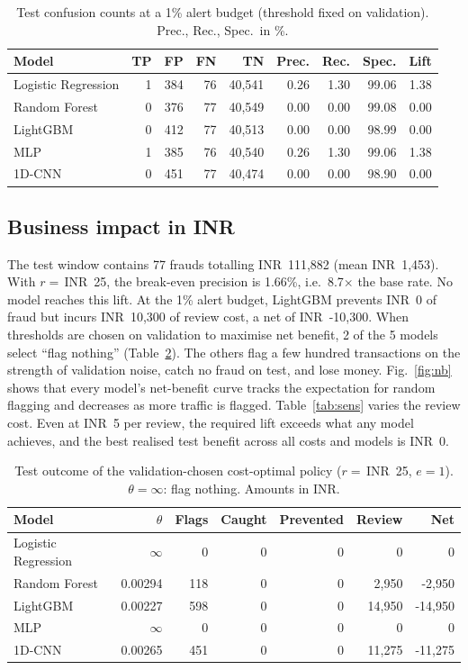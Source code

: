 \documentclass[conference]{IEEEtran}
\newcommand{\inr}{INR~}
\begin{document}
\begin{table}[t]
\centering
\caption{Test confusion counts at a 1\% alert budget (threshold fixed on validation). Prec., Rec., Spec.\ in \%.}\label{tab:conf}
\footnotesize
\setlength{\tabcolsep}{3pt}
\begin{tabular}{@{}lrrrrrrrr@{}}
\toprule
Model & TP & FP & FN & TN & Prec. & Rec. & Spec. & Lift \\
\midrule
Logistic Regression & 1 & 384 & 76 & 40,541 & 0.26 & 1.30 & 99.06 & 1.38 \\
Random Forest & 0 & 376 & 77 & 40,549 & 0.00 & 0.00 & 99.08 & 0.00 \\
LightGBM & 0 & 412 & 77 & 40,513 & 0.00 & 0.00 & 98.99 & 0.00 \\
MLP & 1 & 385 & 76 & 40,540 & 0.26 & 1.30 & 99.06 & 1.38 \\
1D-CNN & 0 & 451 & 77 & 40,474 & 0.00 & 0.00 & 98.90 & 0.00 \\
\bottomrule
\end{tabular}
\end{table}

\subsection{Business impact in INR}\label{sec:business}
The test window contains 77 frauds totalling \inr111,882 (mean \inr1,453). With $r=$\,\inr25, the break-even precision is 1.66\%, i.e.\ 8.7$\times$ the base rate. No model reaches this lift. At the 1\% alert budget, LightGBM prevents \inr0 of fraud but incurs \inr10,300 of review cost, a net of \inr-10,300. When thresholds are chosen on validation to maximise net benefit, 2 of the 5 models select ``flag nothing'' (Table~\ref{tab:cost}). The others flag a few hundred transactions on the strength of validation noise, catch no fraud on test, and lose money. Fig.~\ref{fig:nb} shows that every model's net-benefit curve tracks the expectation for random flagging and decreases as more traffic is flagged. Table~\ref{tab:sens} varies the review cost. Even at \inr5 per review, the required lift exceeds what any model achieves, and the best realised test benefit across all costs and models is \inr0.

\begin{table}[t]
\centering
\caption{Test outcome of the validation-chosen cost-optimal policy ($r=$\,\inr25, $e=1$). $\theta=\infty$: flag nothing. Amounts in INR.}\label{tab:cost}
\footnotesize
\setlength{\tabcolsep}{2.5pt}
\begin{tabular}{@{}lrrrrrr@{}}
\toprule
Model & $\theta$ & Flags & Caught & Prevented & Review & Net \\
\midrule
Logistic Regression & $\infty$ & 0 & 0 & 0 & 0 & 0 \\
Random Forest & 0.00294 & 118 & 0 & 0 & 2,950 & -2,950 \\
LightGBM & 0.00227 & 598 & 0 & 0 & 14,950 & -14,950 \\
MLP & $\infty$ & 0 & 0 & 0 & 0 & 0 \\
1D-CNN & 0.00265 & 451 & 0 & 0 & 11,275 & -11,275 \\
\bottomrule
\end{tabular}
\end{table}
\end{document}

